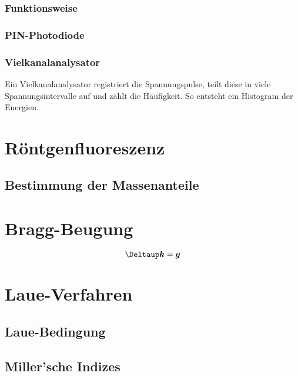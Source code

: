 \subsubsection{Funktionsweise}

\subsubsection{PIN-Photodiode}

\parencite[Abschnitt~„Photodiode“]{wikipedia/pin-Diode}

\subsubsection{Vielkanalanalysator}

Ein Vielkanalanalysator registriert die Spannungspulse, teilt diese in viele
Spannungsintervalle auf und zählt die Häufigkeit.
\parencite{Phywe/Vierkanalanalysator} So entsteht ein Histogram der Energien.
\parencite{wikipedia/Vielkanalanalysator}

\section{Röntgenfluoreszenz}

\subsection{Bestimmung der Massenanteile}

\parencite[„Massenanteilsbestimmung“]{physik412-Anleitung}

\section{Bragg-Beugung}

\parencite[(18.4)]{meschede-gerthsen_24}
\[
    \Deltaup \vec k = \vec g
\]

\section{Laue-Verfahren}

\parencite[P428.5.3, „Auswertung“]{physik412-Anleitung}

\subsection{Laue-Bedingung}

\subsection{Miller'sche Indizes}

